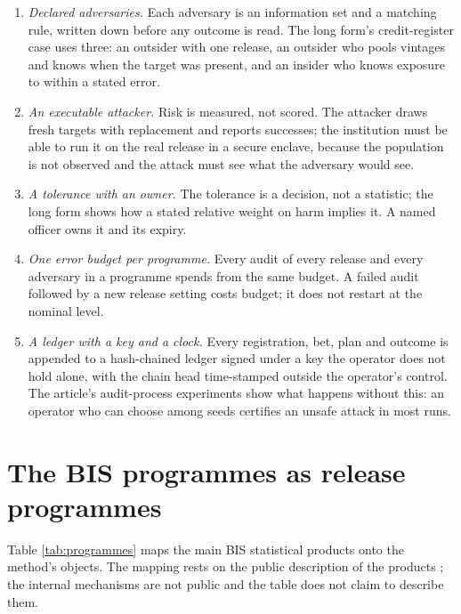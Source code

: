 \documentclass[11pt,a4paper]{article}
\begin{document}
\begin{enumerate}
\item \emph{Declared adversaries.} Each adversary is an information set and a matching rule, written down before any outcome is read. The long form's credit-register case uses three: an outsider with one release, an outsider who pools vintages and knows when the target was present, and an insider who knows exposure to within a stated error.
\item \emph{An executable attacker.} Risk is measured, not scored. The attacker draws fresh targets with replacement and reports successes; the institution must be able to run it on the real release in a secure enclave, because the population is not observed and the attack must see what the adversary would see.
\item \emph{A tolerance with an owner.} The tolerance is a decision, not a statistic; the long form shows how a stated relative weight on harm implies it. A named officer owns it and its expiry.
\item \emph{One error budget per programme.} Every audit of every release and every adversary in a programme spends from the same budget. A failed audit followed by a new release setting costs budget; it does not restart at the nominal level.
\item \emph{A ledger with a key and a clock.} Every registration, bet, plan and outcome is appended to a hash-chained ledger signed under a key the operator does not hold alone, with the chain head time-stamped outside the operator's control. The article's audit-process experiments show what happens without this: an operator who can choose among seeds certifies an unsafe attack in most runs.
\end{enumerate}

\section{The BIS programmes as release programmes}\label{sec:bis}
Table \ref{tab:programmes} maps the main BIS statistical products onto the method's objects. The mapping rests on the public description of the products \citep{bisstats}; the internal mechanisms are not public and the table does not claim to describe them.
\end{document}
